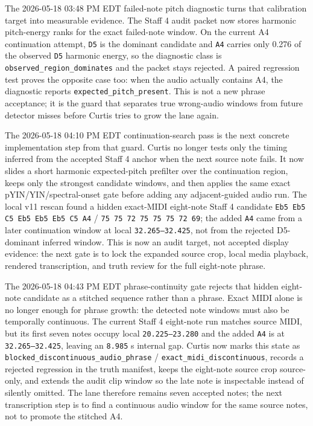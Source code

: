 The 2026-05-18 03:48 PM EDT failed-note pitch diagnostic turns that calibration target into measurable evidence. The Staff 4 audit packet now stores harmonic pitch-energy ranks for the exact failed-note window. On the current A4 continuation attempt, \texttt{D5} is the dominant candidate and \texttt{A4} carries only 0.276 of the observed \texttt{D5} harmonic energy, so the diagnostic class is \texttt{observed\_region\_dominates} and the packet stays rejected. A paired regression test proves the opposite case too: when the audio actually contains A4, the diagnostic reports \texttt{expected\_pitch\_present}. This is not a new phrase acceptance; it is the guard that separates true wrong-audio windows from future detector misses before Curtis tries to grow the lane again.

The 2026-05-18 04:10 PM EDT continuation-search pass is the next concrete implementation step from that guard. Curtis no longer tests only the timing inferred from the accepted Staff 4 anchor when the next source note fails. It now slides a short harmonic expected-pitch prefilter over the continuation region, keeps only the strongest candidate windows, and then applies the same exact pYIN/YIN/spectral-onset gate before adding any adjacent-guided audio run. The local v11 rescan found a hidden exact-MIDI eight-note Staff 4 candidate \texttt{Eb5 Eb5 C5 Eb5 Eb5 Eb5 C5 A4} / \texttt{75 75 72 75 75 75 72 69}; the added \texttt{A4} came from a later continuation window at local \texttt{32.265--32.425}, not from the rejected D5-dominant inferred window. This is now an audit target, not accepted display evidence: the next gate is to lock the expanded source crop, local media playback, rendered transcription, and truth review for the full eight-note phrase.

The 2026-05-18 04:43 PM EDT phrase-continuity gate rejects that hidden eight-note candidate as a stitched sequence rather than a phrase. Exact MIDI alone is no longer enough for phrase growth: the detected note windows must also be temporally continuous. The current Staff 4 eight-note run matches source MIDI, but its first seven notes occupy local \texttt{20.225--23.280} and the added \texttt{A4} is at \texttt{32.265--32.425}, leaving an \texttt{8.985} s internal gap. Curtis now marks this state as \texttt{blocked\_discontinuous\_audio\_phrase} / \texttt{exact\_midi\_discontinuous}, records a rejected regression in the truth manifest, keeps the eight-note source crop source-only, and extends the audit clip window so the late note is inspectable instead of silently omitted. The lane therefore remains seven accepted notes; the next transcription step is to find a continuous audio window for the same source notes, not to promote the stitched A4.

